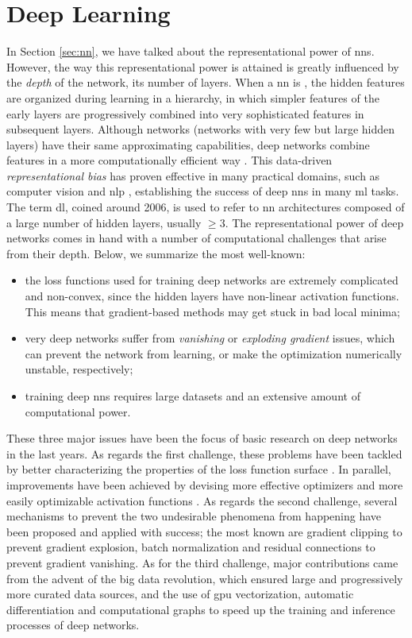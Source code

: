 \section{Deep Learning}
In Section \ref{sec:nn}, we have talked about the representational power of \glspl{nn}. However, the way this representational power is attained is greatly influenced by the \emph{depth} of the network, \ie its number of layers. 
When a \gls{nn} is , the hidden features are organized during learning in a hierarchy, in which simpler features of the early layers are progressively combined into very sophisticated features in subsequent layers. Although  networks (networks with very few but large hidden layers) have their same approximating capabilities, deep networks combine features in a more computationally efficient way \cite{?}. This data-driven \emph{representational bias} has proven effective in many practical domains, such as computer vision \cite{?} and \gls{nlp} \cite{?}, establishing the success of deep \glspl{nn} in many \gls{ml} tasks. The term \gls{dl}, coined around 2006, is used to refer to \gls{nn} architectures composed of a large number of hidden layers, usually $\geq 3$. The representational power of deep networks comes in hand with a number of computational challenges that arise from their depth. Below, we summarize the most well-known:
\begin{itemize}
    \item the loss functions used for training deep networks are extremely complicated and non-convex, since the hidden layers have non-linear activation functions. This means that gradient-based methods may get stuck in bad local minima;
    \item very deep networks suffer from \emph{vanishing} or \emph{exploding gradient} issues, which can prevent the network from learning, or make the optimization numerically unstable, respectively;
    \item training deep \glspl{nn} requires large datasets and an extensive amount of computational power.
\end{itemize}
These three major issues have been the focus of basic research on deep networks in the last years. As regards the first challenge, these problems have been tackled by better characterizing the properties of the loss function surface \cite{?}. In parallel, improvements have been achieved by devising more effective optimizers \cite{?} and more easily optimizable activation functions \cite{?}. As regards the second challenge, several mechanisms to prevent the two undesirable phenomena from happening have been proposed and applied with success; the most known are gradient clipping \cite{?} to prevent gradient explosion, batch normalization \cite{?} and residual connections \cite{?} to prevent gradient vanishing. As for the third challenge, major contributions came from the advent of the big data revolution, which ensured large and progressively more curated data sources, and the use of \gls{gpu} vectorization, automatic differentiation and computational graphs to speed up the training and inference processes of deep networks.

